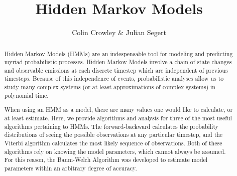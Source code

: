 \documentclass[11pt]{article}
\title{Hidden Markov Models}
\author{Colin Crowley \& Julian Segert}
\date{}
\begin{document}
\maketitle

\begin{abstract}
Hidden Markov Models (HMMs) are an indespensable tool for modeling and predicting myriad probabilistic processes. Hidden Markov Models involve a chain of state changes and observable emissions at each discrete timestep which are independent of previous timesteps. Because of this independence of events, probabilistic analyses allow us to study many complex systems (or at least approximations of complex systems) in polynomial time.

When using an HMM as a model, there are many values one would like to calculate, or at least estimate. Here, we provide algorithms and analysis for three of the most useful algorithms pertaining to HMMs. The forward-backward calculates the probability distributions of seeing the possible observations at any particular timestep, and the Viterbi algorithm calculates the most likely sequence of observations. Both of these algorithms rely on knowing the model parameters, which cannot always be assumed. For this reason, the Baum-Welch Algorithm was developed to estimate model parameters within an arbitrary degree of accuracy.
\end{abstract}



%
%
%
%
%





\appendix
%
%
\end{document}
